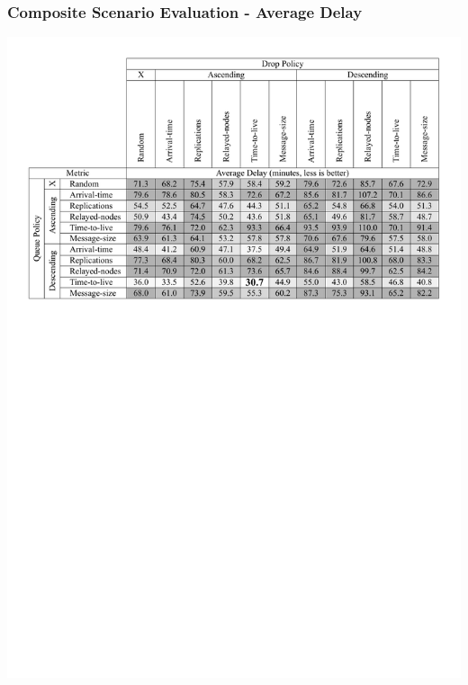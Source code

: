 \begin{frame}
  \frametitle{Composite Scenario Evaluation - Average Delay}
  \begin{center}
   \includegraphics[width=1.0\textwidth]{fig/tables/scenario4_part3.pdf}
  \end{center}
\end{frame}

